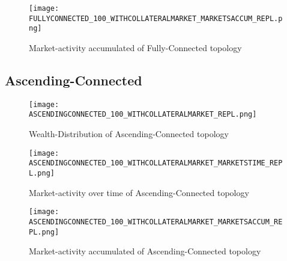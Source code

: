 \documentclass[Bachelorarbeit.tex]{subfiles}
\begin{document}
\begin{figure}[H]
	\centering
  \texttt{[image: FULLYCONNECTED\_100\_WITHCOLLATERALMARKET\_MARKETSACCUM\_REPL.png]}
	\caption{Market-activity accumulated of Fully-Connected topology}
	\label{fig:wealth_FULLYCONNECTED_100_WITHCOLLATERALMARKET_MARKETSACCUM_REPL}
\end{figure}

\subsection{Ascending-Connected}
\begin{figure}[H]
	\centering
  \texttt{[image: ASCENDINGCONNECTED\_100\_WITHCOLLATERALMARKET\_REPL.png]}
	\caption{Wealth-Distribution of Ascending-Connected topology}
	\label{fig:wealth_ASCENDINGCONNECTED_100_WITHCOLLATERALMARKET_REPL}
\end{figure}

\begin{figure}[H]
	\centering
  \texttt{[image: ASCENDINGCONNECTED\_100\_WITHCOLLATERALMARKET\_MARKETSTIME\_REPL.png]}
	\caption{Market-activity over time of Ascending-Connected topology}
	\label{fig:wealth_ASCENDINGCONNECTED_100_WITHCOLLATERALMARKET_MARKETSTIME_REPL}
\end{figure}

\begin{figure}[H]
	\centering
  \texttt{[image: ASCENDINGCONNECTED\_100\_WITHCOLLATERALMARKET\_MARKETSACCUM\_REPL.png]}
	\caption{Market-activity accumulated of Ascending-Connected topology}
	\label{fig:wealth_ASCENDINGCONNECTED_100_WITHCOLLATERALMARKET_MARKETSACCUM_REPL}
\end{figure}
\end{document}
